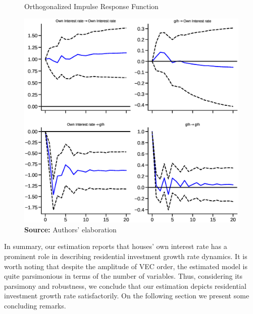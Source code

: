 \begin{figure}[H]
	\centering
	\caption{Orthogonalized Impulse Response Function}
	\label{irf}
	\includegraphics[height=.4\textheight]{./figs/Impulse_VECM.eps}
	\caption*{\textbf{Source:} Authors' elaboration}
\end{figure}

In summary, our estimation reports that houses' own interest rate has a prominent role in describing residential investment growth rate dynamics. 
It is worth noting that despite the amplitude of VEC order, the estimated model is quite parsimonious in terms of the number of variables.
Thus, considering its parsimony and robustness, we conclude that our estimation depicts residential investment growth rate satisfactorily.
On the following section we present some concluding remarks.







